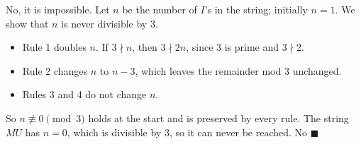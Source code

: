 No, it is impossible. Let $n$ be the number of $I$'s in the string; initially $n=1$. We show that $n$ is never divisible by $3$.
\begin{itemize}
\item Rule 1 doubles $n$. If $3\nmid n$, then $3\nmid2n$, since $3$ is prime and $3\nmid2$.
\item Rule 2 changes $n$ to $n-3$, which leaves the remainder mod $3$ unchanged.
\item Rules 3 and 4 do not change $n$.
\end{itemize}
So $n\not\equiv0\pmod3$ holds at the start and is preserved by every rule. The string $MU$ has $n=0$, which is divisible by $3$, so it can never be reached. $\boxed{\text{No}}$ $\blacksquare$
